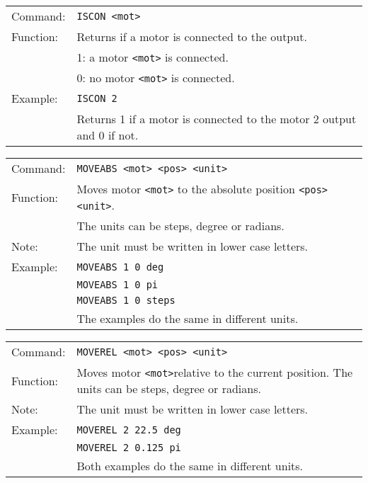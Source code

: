 \vspace{\vdistace}

\begin{table}[h]
  \begin{tabularx}{\textwidth}{lX}
    Command:  & \texttt{ISCON <mot>}\\
    Function: & Returns if a motor is connected to the output.\\
              & 1: a motor \texttt{<mot>} is connected.\\
		      & 0: no motor \texttt{<mot>} is connected.\\
    Example:  & \texttt{ISCON 2}\\
              & Returns 1 if a motor is connected to the motor 2 output and 0 if not.
  \end{tabularx}
\end{table}

\vspace{\vdistace}

\begin{table}[h]
  \begin{tabularx}{\textwidth}{lX}
    Command:  & \texttt{MOVEABS <mot> <pos> <unit>}\\
    Function: & Moves motor \texttt{<mot>} to the absolute position \texttt{<pos> <unit>}.\\
              & The units can be steps, degree or radians.\\
    Note:     & The unit must be written in lower case letters.\\
    Example:  & \texttt{MOVEABS 1 0 deg} \\
              & \texttt{MOVEABS 1 0 pi} \\
              & \texttt{MOVEABS 1 0 steps} \\
              & The examples do the same in different units.
  \end{tabularx}
\end{table}

\vspace{\vdistace}

\begin{table}[h]
  \begin{tabularx}{\textwidth}{lX}
    Command:  & \texttt{MOVEREL <mot> <pos> <unit>}\\
    Function: & Moves motor \texttt{<mot>}relative to the current position.
                The units can be steps, degree or radians.\\
    Note:     & The unit must be written in lower case letters.\\
    Example:  & \texttt{MOVEREL 2 22.5 deg} \\
              & \texttt{MOVEREL 2 0.125 pi} \\
              & Both examples do the same in different units.
  \end{tabularx}
\end{table}

